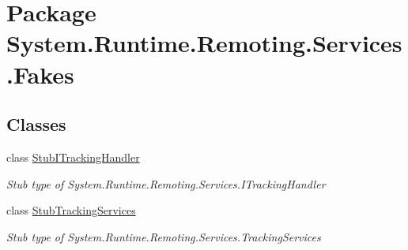 \hypertarget{namespace_system_1_1_runtime_1_1_remoting_1_1_services_1_1_fakes}{\section{Package System.\-Runtime.\-Remoting.\-Services.\-Fakes}
\label{namespace_system_1_1_runtime_1_1_remoting_1_1_services_1_1_fakes}
}
\subsection*{Classes}
\begin{DoxyCompactItemize}
\item 
class \hyperlink{class_system_1_1_runtime_1_1_remoting_1_1_services_1_1_fakes_1_1_stub_i_tracking_handler}{Stub\-I\-Tracking\-Handler}
\begin{DoxyCompactList}\small\item\em Stub type of System.\-Runtime.\-Remoting.\-Services.\-I\-Tracking\-Handler\end{DoxyCompactList}\item 
class \hyperlink{class_system_1_1_runtime_1_1_remoting_1_1_services_1_1_fakes_1_1_stub_tracking_services}{Stub\-Tracking\-Services}
\begin{DoxyCompactList}\small\item\em Stub type of System.\-Runtime.\-Remoting.\-Services.\-Tracking\-Services\end{DoxyCompactList}\end{DoxyCompactItemize}
